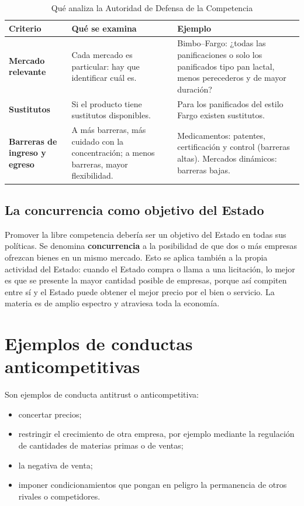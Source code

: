\documentclass[12pt,oneside]{book}
\begin{document}
\begin{table}[H]
\centering
\small
\caption{Qué analiza la Autoridad de Defensa de la Competencia}
\begin{tabularx}{\textwidth}{>{\raggedright\arraybackslash\bfseries}p{2.8cm} >{\raggedright\arraybackslash}X >{\raggedright\arraybackslash}X}
\toprule
Criterio & Qué se examina & Ejemplo \\
\midrule
Mercado relevante & Cada mercado es particular: hay que identificar cuál es. & Bimbo--Fargo: ¿todas las panificaciones o solo los panificados tipo pan lactal, menos perecederos y de mayor duración? \\
Sustitutos & Si el producto tiene sustitutos disponibles. & Para los panificados del estilo Fargo existen sustitutos. \\
Barreras de ingreso y egreso & A más barreras, más cuidado con la concentración; a menos barreras, mayor flexibilidad. & Medicamentos: patentes, certificación y control (barreras altas). Mercados dinámicos: barreras bajas. \\
\bottomrule
\end{tabularx}
\end{table}

\subsection{La concurrencia como objetivo del Estado}

Promover la libre competencia debería ser un objetivo del Estado en todas sus políticas. Se denomina \textbf{concurrencia} a la posibilidad de que dos o más empresas ofrezcan bienes en un mismo mercado. Esto se aplica también a la propia actividad del Estado: cuando el Estado compra o llama a una licitación, lo mejor es que se presente la mayor cantidad posible de empresas, porque así compiten entre sí y el Estado puede obtener el mejor precio por el bien o servicio. La materia es de amplio espectro y atraviesa toda la economía.

\section{Ejemplos de conductas anticompetitivas}

Son ejemplos de conducta antitrust o anticompetitiva:
\begin{itemize}
    \item concertar precios;
    \item restringir el crecimiento de otra empresa, por ejemplo mediante la regulación de cantidades de materias primas o de ventas;
    \item la negativa de venta;
    \item imponer condicionamientos que pongan en peligro la permanencia de otros rivales o competidores.
\end{itemize}
\end{document}
